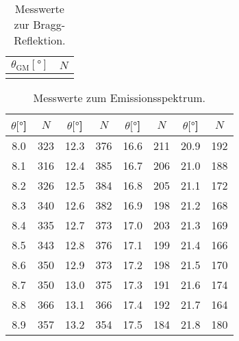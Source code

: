 \begin{table}[H]
    \centering
    \caption{Messwerte zur Bragg-Reflektion.}
    \begin{tabular}{S[table-format=2.1] c}
    \toprule
    {$\theta_\text{GM} [\si{\degree}]$} &
    {$N$} \\
    \midrule
    \bottomrule
    \end{tabular}
  \end{table}
  
\begin{table}[H]
  \centering
  \caption{Messwerte zum Emissionsspektrum.}
  \begin{tabular}{S[table-format=2.1] c | S[table-format=2.1] c | S[table-format=2.1] c | S[table-format=2.1] c}
  \toprule
  {$\theta [\si{\degree}$]} &
  {$N$} &
  {$\theta [\si{\degree}$]} &
  {$N$} &
  {$\theta [\si{\degree}$]} &
  {$N$} &
  {$\theta [\si{\degree}$]} &
  {$N$} \\
  \midrule
\num{8.0}  & \num{323}  &   \num{12.3} & \num{376}  &   \num{16.6} & \num{211}  &   \num{20.9} & \num{192}  \\
\num{8.1}  & \num{316}  &   \num{12.4} & \num{385}  &   \num{16.7} & \num{206}  &   \num{21.0} & \num{188}  \\
\num{8.2}  & \num{326}  &   \num{12.5} & \num{384}  &   \num{16.8} & \num{205}  &   \num{21.1} & \num{172}  \\ 
\num{8.3}  & \num{340}  &   \num{12.6} & \num{382}  &   \num{16.9} & \num{198}  &   \num{21.2} & \num{168}  \\
\num{8.4}  & \num{335}  &   \num{12.7} & \num{373}  &   \num{17.0} & \num{203}  &   \num{21.3} & \num{169}  \\
\num{8.5}  & \num{343}  &   \num{12.8} & \num{376}  &   \num{17.1} & \num{199}  &   \num{21.4} & \num{166}  \\
\num{8.6}  & \num{350}  &   \num{12.9} & \num{373}  &   \num{17.2} & \num{198}  &   \num{21.5} & \num{170}  \\
\num{8.7}  & \num{350}  &   \num{13.0} & \num{375}  &   \num{17.3} & \num{191}  &   \num{21.6} & \num{174}  \\
\num{8.8}  & \num{366}  &   \num{13.1} & \num{366}  &   \num{17.4} & \num{192}  &   \num{21.7} & \num{164}  \\
\num{8.9}  & \num{357}  &   \num{13.2} & \num{354}  &   \num{17.5} & \num{184}  &   \num{21.8} & \num{180}  \\

\end{tabular}
\end{table}
